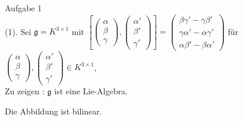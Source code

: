 \documentclass[12pt,leqno,twoside]{book}
\newcommand{\g}{\mathfrak g}
\begin{document}
Aufgabe 1\\	
(1). Sei $\g=K^{3\times1}$ mit $\left[\left(\begin{array}{c} \alpha \\ \beta \\ \gamma \end{array}\right),\left(\begin{array}{c} \alpha' \\ \beta' \\ \gamma' \end{array}\right)\right]=\left(\begin{array}{c} \beta\gamma'-\gamma\beta' \\ \gamma\alpha'-\alpha\gamma' \\ \alpha\beta'-\beta\alpha' \end{array}\right)$ f\"{u}r $\left(\begin{array}{c} \alpha \\ \beta \\ \gamma \end{array}\right),\left(\begin{array}{c} \alpha' \\ \beta' \\ \gamma' \end{array}\right)\in K^{3\times1}$, 
\\Zu zeigen : $\g$ ist eine Lie-Algebra.

Die Abbildung ist bilinear.
\end{document}
